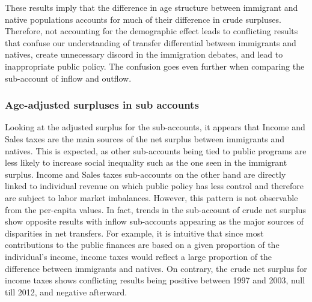 \vspace{0.7em}\par
These results imply that the difference in age structure between immigrant and native populations accounts for much of their difference in crude surpluses.
Therefore, not accounting for the demographic effect leads to conflicting results that confuse our understanding of transfer differential between immigrants and natives, create unnecessary discord in the immigration debates, and lead to inappropriate public policy.
The confusion goes even further when comparing the sub-account of inflow and outflow.


\subsubsection*{Age-adjusted surpluses in sub accounts}

Looking at the adjusted surplus for the sub-accounts, it appears that Income and Sales taxes are the main sources of the net surplus between immigrants and natives.
This is expected, as other sub-accounts being tied to public programs are less likely to increase social inequality such as the one seen in the immigrant surplus.
Income and Sales taxes sub-accounts on the other hand are directly linked to individual revenue on which public policy has less control and therefore are subject to labor market imbalances.
However, this pattern is not observable from the per-capita values.
In fact, trends in the sub-account of crude net surplus show opposite results with inflow sub-accounts appearing as the major sources of disparities in net transfers.
For example, it is intuitive that since most contributions to the public finances are based on a given proportion of the individual's income, income taxes would reflect a large proportion of the difference between immigrants and natives.
On contrary, the crude net surplus for income taxes shows conflicting results being positive between 1997 and 2003, null till 2012, and negative afterward.

